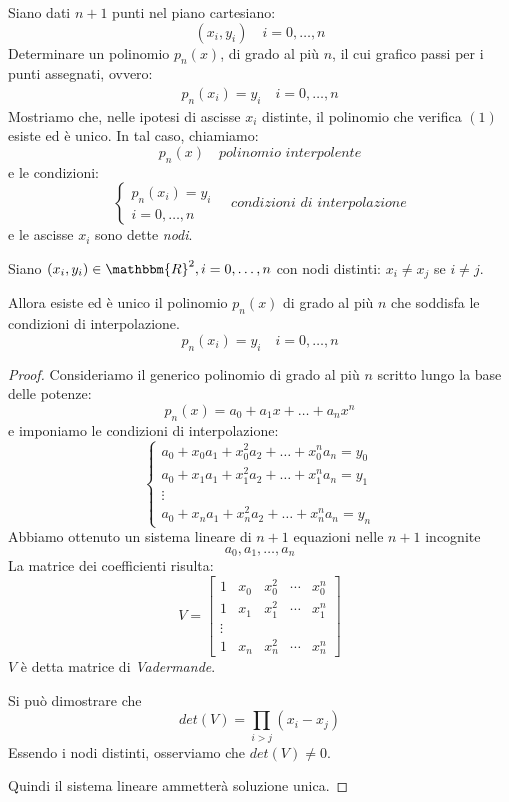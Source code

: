 \documentclass[12pt]{report}
\newcounter{proposition}
\begin{document}
Siano dati $n + 1$ punti nel piano cartesiano:
\[
(x_i, y_i) \quad i = 0, \dots, n
\]
Determinare un polinomio $p_n(x)$, di grado al più $n$, il cui grafico passi per i punti assegnati, ovvero:
\begin{align}
	p_n(x_i) = y_i \quad i = 0, \dots, n
\end{align}
Mostriamo che, nelle ipotesi di ascisse $x_i$ distinte, il polinomio che verifica $(1)$ esiste ed è unico. In tal caso, chiamiamo:
\[
p_n(x) \quad \textit{polinomio interpolente}
\]
e le condizioni:
\[
\begin{cases}
	p_n(x_i) = y_i \\
	i = 0, \dots, n
\end{cases} \quad \textit{condizioni di interpolazione}
\]
e le ascisse $x_i$ sono dette \textit{nodi}.
\begin{proposition}{}{}
Siano $(x_i, y_i) \in \mathbbm{R}^2, i = 0, \dots, n$ con nodi distinti: $x_i \neq x_j$ se $i \neq j$.

Allora esiste ed è unico il polinomio $p_n(x)$ di grado al più $n$ che soddisfa le condizioni di interpolazione.
\[
p_n(x_i) = y_i \quad i = 0, \dots, n
\]
\end{proposition}
\begin{proof}
	Consideriamo il generico polinomio di grado al più  $n$ scritto lungo la base delle potenze:
	\[
	p_n(x) = a_0 + a_1x + \dots + a_nx^n
	\]
	e imponiamo le condizioni di interpolazione:
	\[
	\begin{cases}
		a_0 + x_0a_1 + x_0^2a_2 + \dots + x_0^na_n = y_0 \\
		a_0 + x_1a_1 + x_1^2a_2 + \dots + x_1^na_n = y_1 \\
		\vdots \\
		a_0 + x_na_1 + x_n^2a_2 + \dots + x_n^na_n = y_n
	\end{cases}
	\]
	Abbiamo ottenuto un sistema lineare di $n + 1$ equazioni nelle $n + 1$ incognite
	\[
	a_0, a_1, \dots, a_n
	\]
	La matrice dei coefficienti risulta:
	\[
	V = \begin{bmatrix}
		1 & x_0 & x_0^2 & \cdots & x_0^n \\
		1 & x_1 & x_1^2 & \cdots & x_1^n \\
		\vdots \\
		1 & x_n & x_n^2 & \cdots & x_n^n
	\end{bmatrix}
	\]
	$V$ è detta matrice di \textit{Vadermande}.

	Si può dimostrare che
	\[
	det(V) = \prod_{i > j}(x_i - x_j)
	\]
	Essendo i nodi distinti, osserviamo che $det(V) \neq 0$.

	Quindi il sistema lineare ammetterà soluzione unica.
\end{proof}
\end{document}
